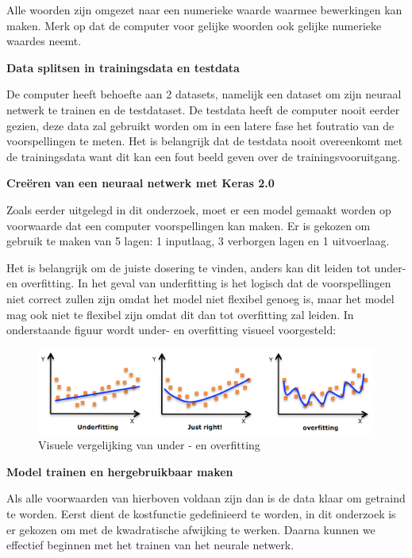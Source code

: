 Alle woorden zijn omgezet naar een numerieke waarde waarmee bewerkingen kan maken. Merk op dat de computer voor gelijke woorden ook gelijke numerieke waardes neemt. 

\textbf{Data splitsen in trainingsdata en testdata}

De computer heeft behoefte aan 2 datasets, namelijk een dataset om zijn neuraal netwerk te trainen en de testdataset. De testdata heeft de computer nooit eerder gezien, deze data zal gebruikt worden om in een latere fase het foutratio van de voorspellingen te meten. Het is belangrijk dat de testdata nooit overeenkomt met de trainingsdata want dit kan een fout beeld geven over de trainingsvooruitgang.

\textbf{Creëren van een neuraal netwerk met Keras 2.0}

Zoals eerder uitgelegd in dit onderzoek, moet er een model gemaakt worden op voorwaarde dat een computer voorspellingen kan maken. Er is gekozen om gebruik te maken van 5 lagen: 1 inputlaag, 3 verborgen lagen en 1 uitvoerlaag. 

Het is belangrijk om de juiste dosering te vinden, anders kan dit leiden tot under- en overfitting. In het geval van underfitting is het logisch dat de voorspellingen niet correct zullen zijn omdat het model niet flexibel genoeg is, maar het model mag ook niet te flexibel zijn omdat dit dan tot overfitting zal leiden. In onderstaande figuur wordt under- en overfitting visueel voorgesteld: 

\vspace{2em}
\begin{figure}[h!]
\centering
\includegraphics[width=1\textwidth]{bachproef/img/overfitting.png}
\caption{Visuele vergelijking van under - en overfitting}
\end{figure}

\newpage

\textbf{Model trainen en hergebruikbaar maken}

Als alle voorwaarden van hierboven voldaan zijn dan is de data klaar om getraind te worden. Eerst dient de kostfunctie gedefinieerd te worden, in dit onderzoek is er gekozen om met de kwadratische afwijking te werken. Daarna kunnen we effectief beginnen met het trainen van het neurale netwerk. 

